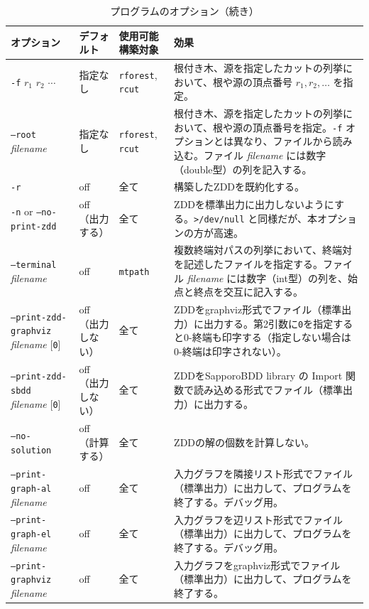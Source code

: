 \documentclass{jsarticle}
\begin{document}
\begin{table}
\caption{プログラムのオプション（続き）}
\label{tab:option2}
\begin{center}
\begin{tabular}[t]{|p{120pt}|p{50pt}|p{80pt}|p{180pt}|}
\hline%
オプション & デフォルト & 使用可能構築対象 & 効果 \\ \hline \hline
\texttt{-f} $r_1$ $r_2$ $\cdots$ & 指定なし & \texttt{rforest}, \texttt{rcut} & 根付き木、源を指定したカットの列挙において、根や源の頂点番号 $r_1, r_2,\ldots$ を指定。\\ \hline
\texttt{--root} \textit{filename} & 指定なし & \texttt{rforest}, \texttt{rcut} & 根付き木、源を指定したカットの列挙において、根や源の頂点番号を指定。\texttt{-f} オプションとは異なり、ファイルから読み込む。ファイル \textit{filename} には数字（double型）の列を記入する。 \\ \hline
\texttt{-r} & off & 全て & 構築したZDDを既約化する。\\ \hline
\texttt{-n} or \texttt{--no-print-zdd} & off（出力する） & 全て & ZDDを標準出力に出力しないようにする。\texttt{>/dev/null} と同様だが、本オプションの方が高速。 \\ \hline
\texttt{--terminal} \textit{filename} & off & \texttt{mtpath} & 複数終端対パスの列挙において、終端対を記述したファイルを指定する。ファイル \textit{filename} には数字（int型）の列を、始点と終点を交互に記入する。 \\ \hline
\texttt{--print-zdd-graphviz} \quad \textit{filename} [\texttt{0}] & off（出力しない） & 全て & ZDDをgraphviz形式でファイル（標準出力）に出力する。第2引数に\texttt{0}を指定すると0-終端も印字する（指定しない場合は0-終端は印字されない）。 \\ \hline
\texttt{--print-zdd-sbdd} \quad \textit{filename} [\texttt{0}] & off（出力しない） & 全て & ZDDをSapporoBDD library の Import 関数で読み込める形式でファイル（標準出力）に出力する。 \\ \hline
\texttt{--no-solution} & off（計算する） & 全て & ZDDの解の個数を計算しない。 \\ \hline
\texttt{--print-graph-al} \textit{filename} & off & 全て & 入力グラフを隣接リスト形式でファイル（標準出力）に出力して、プログラムを終了する。デバッグ用。 \\ \hline
\texttt{--print-graph-el} \textit{filename} & off & 全て & 入力グラフを辺リスト形式でファイル（標準出力）に出力して、プログラムを終了する。デバッグ用。 \\ \hline
\texttt{--print-graphviz} \textit{filename} & off & 全て & 入力グラフをgraphviz形式でファイル（標準出力）に出力して、プログラムを終了する。 \\ \hline
\end{tabular}
\end{center}
\end{table}
\end{document}
